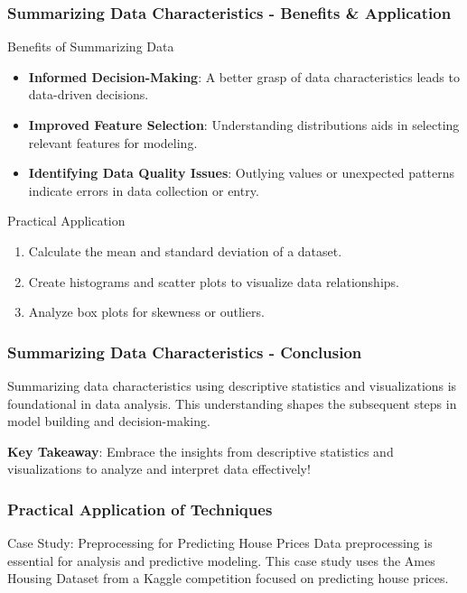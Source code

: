 \documentclass[aspectratio=169]{beamer}
\begin{document}
\begin{frame}[fragile]
    \frametitle{Summarizing Data Characteristics - Benefits & Application}
    \begin{block}{Benefits of Summarizing Data}
        \begin{itemize}
            \item \textbf{Informed Decision-Making}: A better grasp of data characteristics leads to data-driven decisions.
            \item \textbf{Improved Feature Selection}: Understanding distributions aids in selecting relevant features for modeling.
            \item \textbf{Identifying Data Quality Issues}: Outlying values or unexpected patterns indicate errors in data collection or entry.
        \end{itemize}
    \end{block}

    \begin{block}{Practical Application}
        \begin{enumerate}
            \item Calculate the mean and standard deviation of a dataset.
            \item Create histograms and scatter plots to visualize data relationships.
            \item Analyze box plots for skewness or outliers.
        \end{enumerate}
    \end{block}
\end{frame}

\begin{frame}[fragile]
    \frametitle{Summarizing Data Characteristics - Conclusion}
    Summarizing data characteristics using descriptive statistics and visualizations is foundational in data analysis.
    This understanding shapes the subsequent steps in model building and decision-making.
    
    \textbf{Key Takeaway}: Embrace the insights from descriptive statistics and visualizations to analyze and interpret data effectively!
\end{frame}

\begin{frame}[fragile]
    \frametitle{Practical Application of Techniques}
    \begin{block}{Case Study: Preprocessing for Predicting House Prices}
        Data preprocessing is essential for analysis and predictive modeling. This case study uses the Ames Housing Dataset from a Kaggle competition focused on predicting house prices.
    \end{block}
\end{frame}
\end{document}
